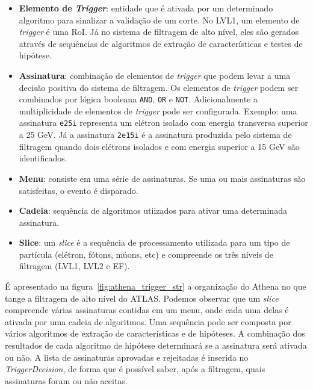 \begin{itemize}

\item \textbf{Elemento de \emph{Trigger}}: entidade que é ativada por um determinado algoritmo para sinalizar a validação de um corte.  No LVL1, um elemento de \emph{trigger} é uma RoI. Já no sistema de filtragem de alto nível, eles são gerados através de sequências de algoritmos de extração de características e testes de hipótese.

\item \textbf{Assinatura}:  combinação de elementos de \emph{trigger} que podem levar a uma decisão positiva do sistema de filtragem. Os elementos de \emph{trigger} podem ser combinados por lógica booleana \texttt{AND}, \texttt{OR} e \texttt{NOT}. Adicionalmente a multiplicidade de elementos de \emph{trigger} pode ser configurada. Exemplo: uma assinatura  \texttt{e25i} representa um elétron isolado com energia transversa superior a 25 GeV. Já a assinatura \texttt{2e15i} é a assinatura produzida pelo sistema de filtragem quando dois elétrons isolados e com energia superior a 15 GeV são identificados.

\item \textbf{Menu}: consiste em uma série de assinaturas. Se uma ou mais assinaturas são satisfeitas, o evento é disparado.

\item \textbf{Cadeia}: sequência de algoritmos utiizados para ativar uma determinada assinatura.

\item \textbf{Slice}: um \emph{slice}  é a sequência de processamento utilizada para um tipo de partícula (elétron, fótons, múons, etc) e compreende os três níveis de filtragem (LVL1, LVL2 e EF).

\end{itemize}

É apresentado na figura~\ref{fig:athena_trigger_str} a organização do Athena no que tange a filtragem de alto nível do ATLAS. Podemos observar que um \emph{slice} compreende várias assinaturas contidas em um menu, onde cada uma delas é ativada por uma cadeia de algoritmos. Uma sequência pode ser composta por vários algoritmos de extração de características e de hipóteses. A combinação dos resultados de cada algoritmo de hipótese determinará se a assinatura será ativada ou não. A lista de assinaturas aprovadas e rejeitadas é inserida no \emph{TriggerDecision}, de forma que é possível saber, após a filtragem, quais assinaturas foram ou não aceitas.

